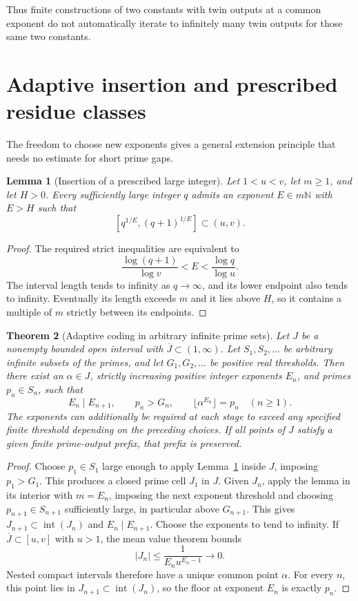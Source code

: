 \documentclass[11pt,a4paper]{article}
\newtheorem{theorem}{Theorem}[section]
\newtheorem{lemma}[theorem]{Lemma}
\theoremstyle{definition}
\theoremstyle{remark}
\numberwithin{equation}{section}
\begin{document}
Thus finite constructions of two constants with twin outputs at a common
exponent do not automatically iterate to infinitely many twin outputs
for those same two constants.

\section{Adaptive insertion and prescribed residue classes}
\label{enc:sp:adaptive}

The freedom to choose new exponents gives a general extension principle
that needs no estimate for short prime gaps.
\begin{lemma}[Insertion of a prescribed large integer]\label{enc:sp:insertion}
Let $1<u<v$, let $m\ge1$, and let $H>0$. Every sufficiently large integer
$q$ admits an exponent $E\in m\mathbb N$ with $E>H$ such that
\[
 [q^{1/E},(q+1)^{1/E}]\subset(u,v).
\]
\end{lemma}
\begin{proof}
The required strict inequalities are equivalent to
\[
 \frac{\log(q+1)}{\log v}<E<\frac{\log q}{\log u}.
\]
The interval length tends to infinity as $q\to\infty$, and its lower
endpoint also tends to infinity. Eventually its length exceeds $m$ and
it lies above $H$, so it contains a multiple of $m$ strictly between its
endpoints.
\end{proof}

\begin{theorem}[Adaptive coding in arbitrary infinite prime sets]
\label{enc:sp:adaptive-coding}
Let $J$ be a nonempty bounded open interval with $\overline J\subset(1,\infty)$.
Let $S_1,S_2,\ldots$ be arbitrary infinite subsets of the primes, and let
$G_1,G_2,\ldots$ be positive real thresholds. Then there exist an
$\alpha\in J$, strictly increasing positive integer exponents $E_n$, and
primes $p_n\in S_n$, such that
\[
 E_n\mid E_{n+1},\qquad p_n>G_n,\qquad
 \lfloor\alpha^{E_n}\rfloor=p_n\quad(n\ge1).
\]
The exponents can additionally be required at each stage to exceed any
specified finite threshold depending on the preceding choices. If all
points of $J$ satisfy a given finite prime-output prefix, that prefix is
preserved.
\end{theorem}
\begin{proof}
Choose $p_1\in S_1$ large enough to apply Lemma~\ref{enc:sp:insertion} inside
$J$, imposing $p_1>G_1$. This produces a closed prime cell $J_1$ in $J$.
Given $J_n$, apply the lemma in its interior with $m=E_n$, imposing the
next exponent threshold and choosing $p_{n+1}\in S_{n+1}$ sufficiently
large, in particular above $G_{n+1}$. This gives
$J_{n+1}\subset\operatorname{int}(J_n)$ and $E_n\mid E_{n+1}$.
Choose the exponents to tend to infinity.
If $\overline J\subset[u,v]$ with $u>1$, the mean value theorem bounds
\[
 |J_n|\le\frac{1}{E_nu^{E_n-1}}\longrightarrow0.
\]
Nested compact intervals therefore have a unique common point $\alpha$.
For every $n$, this point lies in $J_{n+1}\subset\operatorname{int}(J_n)$,
so the floor at exponent $E_n$ is exactly $p_n$.
\end{proof}
\end{document}
